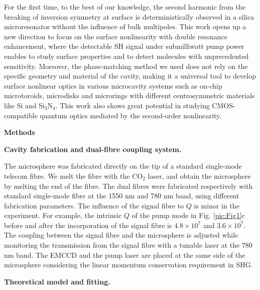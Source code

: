 \documentclass[a4paper,8pt,hyperref, twocolumn, aps, prl]{article}
\begin{document}
For the first time, to the best of our knowledge, the second harmonic from the breaking of inversion symmetry at surface is deterministically observed in a silica microresonator without the influence of bulk multipoles. 
This work opens up a new direction to focus on the surface nonlinearity with double resonance enhancement, where the detectable SH signal under submilliwatt pump power enables to study surface properties and to detect molecules with unprecedented sensitivity. 
Moreover, the phase-matching method we used does not rely on the specific geometry and material of the cavity, making it a universal tool to develop surface nonlinear optics in various microcavity systems such as on-chip microtoroids, microdisks and microrings with different centrosymmetric materials like Si and Si$_3$N$_4$.
This work also shows great potential in studying CMOS-compatible quantum optics mediated by the second-order nonlinearity.
 
\bigskip
\noindent \textbf{\large Methods}

\noindent \textbf{Cavity fabrication and dual-fibre coupling system.}

\noindent The microsphere was fabricated directly on the tip of a standard single-mode telecom fibre. 
We melt the fibre with the CO$_2$ laser, and obtain the microsphere by melting the end of the fibre.
The dual fibres were fabricated respectively with standard single-mode fibre at the 1550 nm and 780 nm band, using different fabrication parameters.
The influence of the signal fibre to $Q$ is minor in the experiment.
For example, the intrinsic $Q$ of the pump mode in Fig. \ref{pic:Fig1}c before and after the incorporation of the signal fibre is $4.8\times10^7$ and $3.6\times10^7$.
The coupling between the signal fibre and the microsphere is adjusted while monitoring the transmission from the signal fibre with a tunable laser at the $780$ nm band.
The EMCCD and the pump laser are placed at the same side of the microsphere considering the linear momentum conservation requirement in SHG.

\noindent \textbf{Theoretical model and fitting.}
\end{document}
